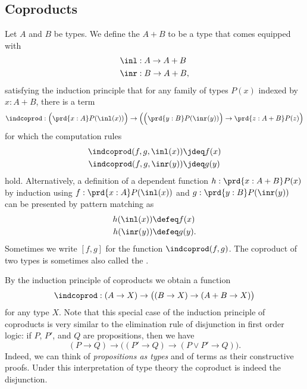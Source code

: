 \subsection{Coproducts}\label{sec:coprod}
\begin{defn}
Let $A$ and $B$ be types. We define the  $A+B$ to be a type that comes equipped with
\begin{align*}
\inl & : A \to A+B \\*
\inr & : B \to A+B,
\end{align*}
satisfying the induction principle that for any family of types $P(x)$ indexed by $x:A+B$, there is a term
\begin{equation*}
\indcoprod : \Big(\prd{x:A}P(\inl(x))\Big)\to\Big(\Big(\prd{y:B}P(\inr(y))\Big)\to\prd{z:A+B}P(z)\Big)
\end{equation*}
for which the computation rules
\begin{align*}
\indcoprod(f,g,\inl(x)) & \jdeq f(x) \\*
\indcoprod(f,g,\inr(y)) & \jdeq g(y)
\end{align*}
hold. Alternatively, a definition of a dependent function $h:\prd{x:A+B}P(x)$ by induction using $f:\prd{x:A}P(\inl(x))$ and $g:\prd{y:B}P(\inr(y))$ can be presented by pattern matching as
\begin{align*}
  h(\inl(x)) & \defeq f(x) \\*
  h(\inr(y)) & \defeq g(y).
\end{align*}
Sometimes we write $[f,g]$ for the function $\indcoprod(f,g)$. The coproduct of two types is sometimes also called the .
\end{defn}

By the induction principle of coproducts we obtain a function
\begin{equation*}
  \indcoprod:(A\to X) \to \big((B\to X) \to (A+B\to X)\big)
\end{equation*}
for any type $X$. Note that this special case of the induction principle of coproducts is very similar to the elimination rule of disjunction in first order logic: if $P$, $P'$, and $Q$ are propositions, then we have
\begin{equation*}
  (P\to Q)\to \big((P'\to Q)\to (P\lor P'\to Q)\big).
\end{equation*}
Indeed, we can think of \emph{propositions as types} and of terms as their constructive proofs. Under this interpretation of type theory the coproduct is indeed the disjunction.

